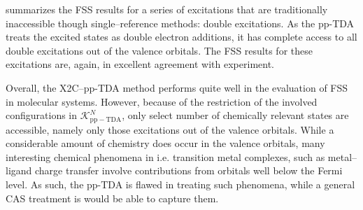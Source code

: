  summarizes the FSS results for a series of excitations that
are traditionally inaccessible though single--reference methods: double
excitations.  As the pp-TDA treats the excited states as double electron
additions, it has complete access to all double excitations out of the valence
orbitals. 
The FSS results for these excitations are, again, in excellent agreement with
experiment.

Overall, the X2C--pp-TDA method performs quite well in the evaluation of FSS in
molecular systems. However, because of the restriction of the involved
configurations in $\mathcal{K}_\mathrm{pp-TDA}^N$, only select number of
chemically relevant states are accessible, namely only those excitations out of
the valence orbitals. While a considerable amount of chemistry does occur in the
valence orbitals, many interesting chemical phenomena in i.e. transition metal
complexes, such as metal--ligand charge transfer involve contributions from
orbitals well below the Fermi level. As such, the pp-TDA is flawed in treating
such phenomena, while a general CAS treatment is would be able to capture them.

